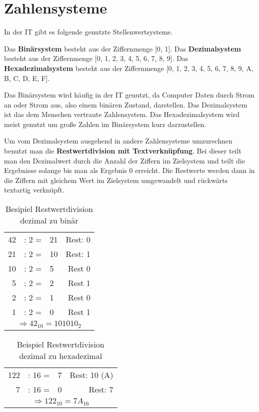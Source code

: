 \section{Zahlensysteme}

In der IT gibt es folgende genutzte Stellenwertsysteme.

Das \textbf{Binärsystem} besteht aus der Ziffernmenge [0, 1]. Das \textbf{Dezimalsystem} besteht aus der Ziffernmenge [0, 1, 2, 3, 4, 5, 6, 7, 8, 9]. Das \textbf{Hexadezimalsystem} besteht aus der Ziffernmenge [0, 1, 2, 3, 4, 5, 6, 7, 8, 9, A, B, C, D, E, F].

Das Binärsystem wird häufig in der IT genutzt, da Computer Daten durch Strom an oder Strom aus, also einem binären Zustand, darstellen. Das Dezimalsystem ist das dem Menschen vertraute Zahlensystem. Das Hexadezimalsystem wird meist genutzt um große Zahlen im Binärsystem kurz darzustellen.

Um vom Dezimalsystem ausgehend in andere Zahlensysteme umzurechnen benutzt man die \textbf{Restwertdivision mit Textverknüpfung}. Bei dieser teilt man den Dezimalwert durch die Anzahl der Ziffern im Zielsystem und teilt die Ergebnisse solange bis man als Ergebnis 0 erreicht. Die Restwerte werden dann in die Ziffern mit gleichem Wert im Zielsystem umgewandelt und rückwärts textartig verknüpft.

\begin{table} [H]
    \centering
    \begin{tabular}{rclr}
        42 & : 2 = & 21 & Rest: 0 \\
        21 & : 2 = & 10 & Rest: 1 \\
        10 & : 2 = & 5  & Rest 0  \\
        5  & : 2 = & 2  & Rest 1  \\
        2  & : 2 = & 1  & Rest 0  \\
        1  & : 2 = & 0  & Rest 1  \\\hline
        \multicolumn{4}{c}{$\Rightarrow 42_{10} = 101010_2$}
    \end{tabular}
    \caption{Besipiel Restwertdivision dezimal zu binär}
\end{table}

\begin{table}
    [H]
    \centering
    \begin{tabular}{rclr}
        122 & : 16 = & 7 & Rest: 10 (A) \\
        7   & : 16 = & 0 & Rest: 7      \\\hline
        \multicolumn{4}{c}{$\Rightarrow 122_{10} = 7A_{16}$}
    \end{tabular}
    \caption{Beispiel Restwertdivision dezimal zu hexadezimal}
\end{table}

